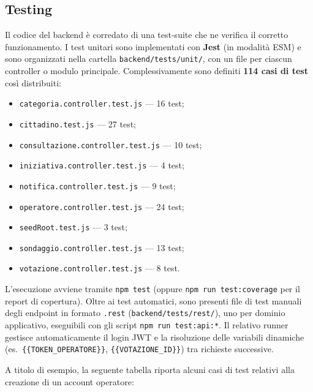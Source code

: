 \documentclass{article}
\newcommand{\code}[1]{\texttt{\small #1}}
\begin{document}
\subsection{Testing}

Il codice del backend è corredato di una test-suite che ne verifica il corretto
funzionamento. I test unitari sono implementati con \textbf{Jest} (in modalità ESM) e sono
organizzati nella cartella \code{backend/tests/unit/}, con un file per ciascun controller o
modulo principale. Complessivamente sono definiti \textbf{114 casi di test} così distribuiti:

\begin{itemize}
	\item \code{categoria.controller.test.js} --- 16 test;
	\item \code{cittadino.test.js} --- 27 test;
	\item \code{consultazione.controller.test.js} --- 10 test;
	\item \code{iniziativa.controller.test.js} --- 4 test;
	\item \code{notifica.controller.test.js} --- 9 test;
	\item \code{operatore.controller.test.js} --- 24 test;
	\item \code{seedRoot.test.js} --- 3 test;
	\item \code{sondaggio.controller.test.js} --- 13 test;
	\item \code{votazione.controller.test.js} --- 8 test.
\end{itemize}

L'esecuzione avviene tramite \code{npm test} (oppure \code{npm run test:coverage} per il
report di copertura). Oltre ai test automatici, sono presenti file di test manuali degli
endpoint in formato \code{.rest} (\code{backend/tests/rest/}), uno per dominio applicativo,
eseguibili con gli script \code{npm run test:api:*}. Il relativo runner gestisce
automaticamente il login JWT e la risoluzione delle variabili dinamiche
(es.\ \code{\{\{TOKEN\_OPERATORE\}\}}, \code{\{\{VOTAZIONE\_ID\}\}}) tra richieste successive.

A titolo di esempio, la seguente tabella riporta alcuni casi di test relativi alla creazione
di un account operatore:
\end{document}
